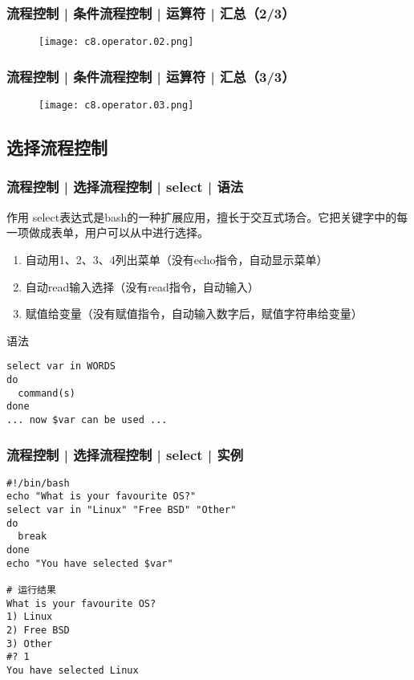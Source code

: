 \begin{frame}
  \frametitle{流程控制 | 条件流程控制 | 运算符 | 汇总（2/3）}
  \begin{figure}
    \centering
    \texttt{[image: c8.operator.02.png]}
  \end{figure}
\end{frame}

\begin{frame}
  \frametitle{流程控制 | 条件流程控制 | 运算符 | 汇总（3/3）}
  \begin{figure}
    \centering
    \texttt{[image: c8.operator.03.png]}
  \end{figure}
\end{frame}

\subsection{选择流程控制}
\begin{frame}[fragile]
  \frametitle{流程控制 | 选择流程控制 | select | \alert{语法}}
  \begin{block}{作用}
    select表达式是bash的一种扩展应用，擅长于交互式场合。它把关键字中的每一项做成表单，用户可以从中进行选择。
    \begin{enumerate}
      \item 自动用1、2、3、4列出菜单（没有echo指令，自动显示菜单）
      \item 自动read输入选择（没有read指令，自动输入）
      \item 赋值给变量（没有赋值指令，自动输入数字后，赋值字符串给变量）
    \end{enumerate}
  \end{block}
  \pause
  \begin{block}{语法}
\begin{lstlisting}
select var in WORDS
do
  command(s)
done
... now $var can be used ...
\end{lstlisting}
  \end{block}
\end{frame}

\begin{frame}[fragile]
  \frametitle{流程控制 | 选择流程控制 | select | \alert{实例}}
\begin{lstlisting}
#!/bin/bash
echo "What is your favourite OS?"
select var in "Linux" "Free BSD" "Other"
do
  break
done
echo "You have selected $var"

# 运行结果
What is your favourite OS?
1) Linux
2) Free BSD
3) Other
#? 1
You have selected Linux
\end{lstlisting}
\end{frame}

